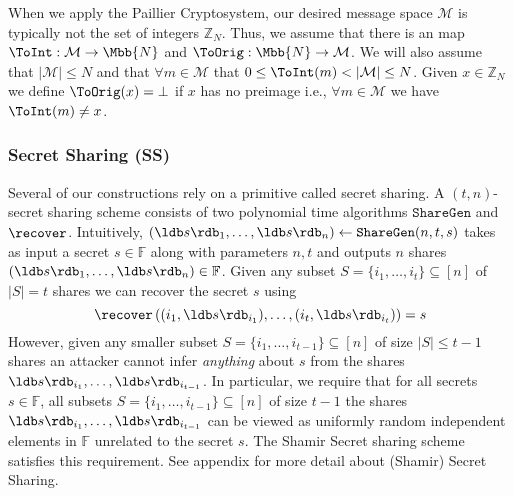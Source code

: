 

When we apply the Paillier Cryptosystem, our desired message space $\mathcal{M}$ is typically not the set of integers $\mathbb{Z}_N$. Thus, we assume that there is an  map $ \ToInt: \mathcal{M} \to \Mbb{N} $ and $ \ToOrig: \Mbb{N} \to  \mathcal{M}$. We will also assume that $|\mathcal{M}| \leq N$ and that $\forall m \in \mathcal{M}$ that $0 \leq \ToInt(m) < \left| \mathcal{M}\right| \leq  N$. Given $x \in \mathbb{Z}_N$ we define $\ToOrig (x) = \bot$ if $x$ has no preimage i.e., $\forall m \in \mathcal{M}$ we have $\ToInt(m) \neq x$.
\subsubsection{Secret Sharing (SS)}
Several of our constructions rely on a primitive called secret sharing. A $(t,n)$-secret sharing scheme consists of two polynomial time algorithms $\mathtt{ShareGen}$ and $\recover$. Intuitively, $\left( \ldb s \rdb_1, \ldots,  \ldb s \rdb_n\right) \gets \mathtt{ShareGen}(n,t,s)$ takes as input a secret $s \in \mathbb{F}$ along with parameters $n,t$ and outputs $n$ shares $\left(\ldb s \rdb_1, \ldots, \ldb s \rdb_n\right) \in \mathbb{F}$. Given any subset $S = \{i_1,\ldots, i_t\} \subseteq [n]$ of $|S| = t$ shares we can recover the secret $s$ using  $$\recover\left(\left(i_1, \ldb s \rdb_{i_1}), \ldots, (i_t, \ldb s \rdb_{i_t}\right)\right) = s$$ However, given any smaller subset $S=\{i_1,\ldots, i_{t-1}\} \subseteq [n]$ of size $|S| \leq t-1$ shares an attacker cannot infer {\em anything} about $s$ from the shares $\ldb s \rdb_{i_1}, \ldots, \ldb s \rdb_{i_{t-1}}$. In particular, we require that  for all secrets $s \in \mathbb{F}$,  all subsets $S = \{i_1,\ldots, i_{t-1}\} \subseteq [n]$ of size $t-1$ the shares  $\ldb s \rdb_{i_1}, \ldots,  \ldb s \rdb_{i_{t-1}}$ can be viewed as uniformly random independent elements in $\mathbb{F}$ unrelated to the secret $s$. The Shamir Secret sharing scheme \cite{CACM:Shamir79} satisfies this requirement. See appendix  for more detail about (Shamir) Secret Sharing.

